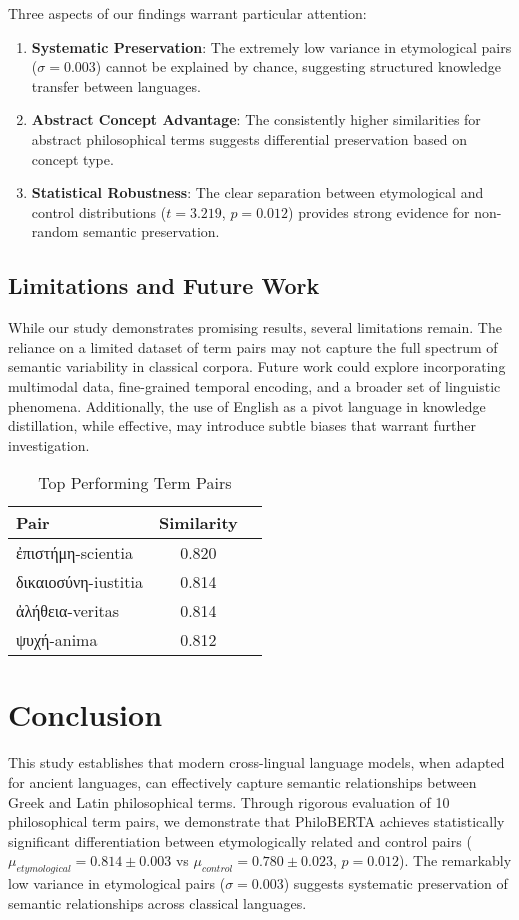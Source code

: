 \documentclass[11pt]{article} %
\begin{document}
Three aspects of our findings warrant particular attention:

\begin{enumerate}
\item \textbf{Systematic Preservation}: The extremely low variance in etymological pairs ($\sigma = 0.003$) cannot be explained by chance, suggesting structured knowledge transfer between languages.

\item \textbf{Abstract Concept Advantage}: The consistently higher similarities for abstract philosophical terms suggests differential preservation based on concept type.

\item \textbf{Statistical Robustness}: The clear separation between etymological and control distributions ($t = 3.219$, $p = 0.012$) provides strong evidence for non-random semantic preservation.
\end{enumerate}

\subsection*{Limitations and Future Work}
While our study demonstrates promising results, several limitations remain. The reliance on a limited dataset of term pairs may not capture the full spectrum of semantic variability in classical corpora. Future work could explore incorporating multimodal data, fine-grained temporal encoding, and a broader set of linguistic phenomena. Additionally, the use of English as a pivot language in knowledge distillation, while effective, may introduce subtle biases that warrant further investigation.

\begin{table}[htbp]
\centering
\caption{Top Performing Term Pairs}
\begin{tabular}{lcc}
Pair & Similarity \\
\hline
\textgreek{ἐπιστήμη}-scientia & 0.820 \\
\textgreek{δικαιοσύνη}-iustitia & 0.814 \\
\textgreek{ἀλήθεια}-veritas & 0.814  \\
\textgreek{ψυχή}-anima & 0.812 \\
\end{tabular}
\end{table}

\section{Conclusion}
This study establishes that modern cross-lingual language models, when adapted for ancient languages, can effectively capture semantic relationships between Greek and Latin philosophical terms. Through rigorous evaluation of 10 philosophical term pairs, we demonstrate that PhiloBERTA achieves statistically significant differentiation between etymologically related and control pairs ($\mu_{etymological} = 0.814 \pm 0.003$ vs $\mu_{control} = 0.780 \pm 0.023$, $p = 0.012$). The remarkably low variance in etymological pairs ($\sigma = 0.003$) suggests systematic preservation of semantic relationships across classical languages.
\end{document}
